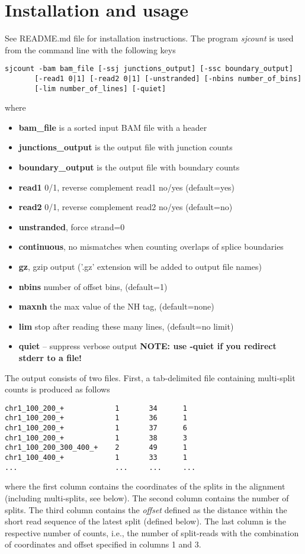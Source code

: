 \documentclass{article}
\begin{document}
\section{Installation and usage}
See README.md file for installation instructions. The program {\em sjcount} is used from the command line with the following keys
\begin{verbatim}
sjcount -bam bam_file [-ssj junctions_output] [-ssc boundary_output]
       [-read1 0|1] [-read2 0|1] [-unstranded] [-nbins number_of_bins]
       [-lim number_of_lines] [-quiet]
\end{verbatim}
where
\begin{itemize}
\item {\bf bam\_file} is a sorted input BAM file with a header
\item {\bf junctions\_output} is the output file with junction counts
\item {\bf boundary\_output} is the output file with boundary counts
\item {\bf read1} 0/1, reverse complement read1 no/yes (default=yes)
\item {\bf read2} 0/1, reverse complement read2 no/yes (default=no)
\item {\bf unstranded}, force strand=0
\item {\bf continuous}, no mismatches when counting overlaps of splice boundaries
\item {\bf gz}, gzip output ('.gz' extension will be added to output file names)
\item {\bf nbins} number of offset bins, (default=1)
\item {\bf maxnh} the max value of the NH tag, (default=none)
\item {\bf lim} stop after reading these many lines, (default=no limit)
\item {\bf quiet} -- suppress verbose output {\bf NOTE: use -quiet if you redirect stderr to a file!}
\end{itemize}

The output consists of two files. First, a tab-delimited file containing multi-split counts is produced as follows
\begin{verbatim}
chr1_100_200_+            1       34      1
chr1_100_200_+            1       36      1
chr1_100_200_+            1       37      6
chr1_100_200_+            1       38      3
chr1_100_200_300_400_+    2       49      1
chr1_100_400_+            1       33      1
...                       ...     ...     ...
\end{verbatim}
where the first column contains the coordinates of the splits in the alignment (including multi-splits, see below). 
The second column contains the number of splits. The third column contains the {\em offset} defined as the distance within 
the short read sequence of the latest split (defined below). The last column is the respective number of counts, i.e., the 
number of split-reads with the combination of coordinates and offset specified in columns 1 and 3.
\end{document}
